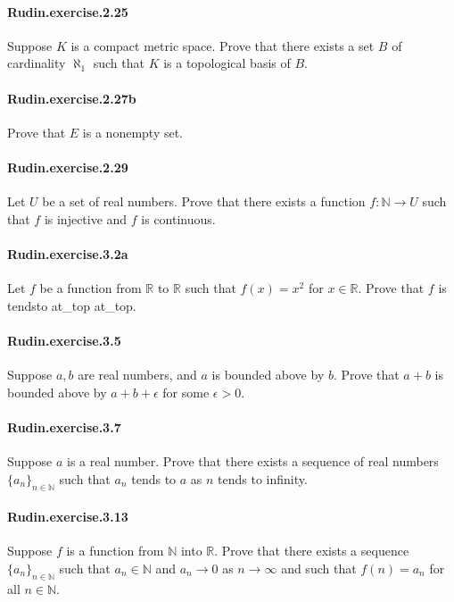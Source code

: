 \documentclass{article}
\begin{document}
\paragraph{Rudin.exercise.2.25} Suppose $K$ is a compact metric space. Prove that there exists a set $B$ of cardinality $\aleph_1$ such that $K$ is a topological basis of $B$.

\paragraph{Rudin.exercise.2.27b} Prove that $E$ is a nonempty set.

\paragraph{Rudin.exercise.2.29} Let $U$ be a set of real numbers. Prove that there exists a function $f: ℕ → U$ such that $f$ is injective and $f$ is continuous.

\paragraph{Rudin.exercise.3.2a} Let $f$ be a function from $\mathbb{R}$ to $\mathbb{R}$ such that $f(x) = x^2$ for $x \in \mathbb{R}$. Prove that $f$ is tendsto at_top at_top.

\paragraph{Rudin.exercise.3.5} Suppose $a, b$ are real numbers, and $a$ is bounded above by $b$. Prove that $a + b$ is bounded above by $a + b + \epsilon$ for some $\epsilon > 0$.

\paragraph{Rudin.exercise.3.7} Suppose $a$ is a real number. Prove that there exists a sequence of real numbers $\{a_n\}_{n\in\mathbb{N}}$ such that $a_n$ tends to $a$ as $n$ tends to infinity.

\paragraph{Rudin.exercise.3.13} Suppose $f$ is a function from $\mathbb{N}$ into $\mathbb{R}$. Prove that there exists a sequence $\{a_n\}_{n\in\mathbb{N}}$ such that $a_n \in \mathbb{N}$ and $a_n \to 0$ as $n\to\infty$ and such that $f(n) = a_n$ for all $n\in\mathbb{N}$.
\end{document}
